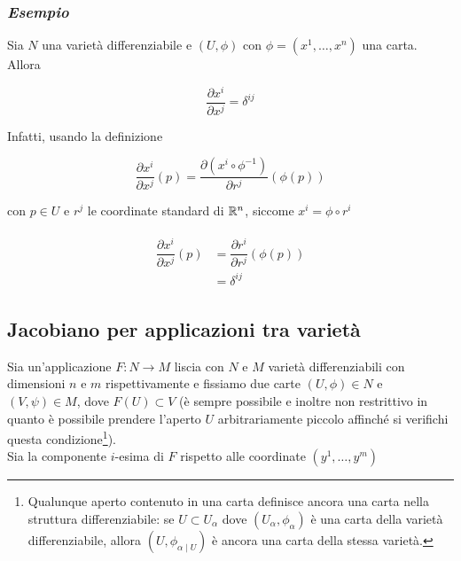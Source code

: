 \subsubsection{\textit{Esempio}}

Sia $ N $ una varietà differenziabile e $ (U,\phi) $ con $ \phi = (x^{1},\dots,x^{n}) $ una carta.\\
Allora

\begin{equation}
	\dfrac{\partial x^{i}}{\partial x^{j}} = \delta^{ij}
\end{equation}

Infatti, usando la definizione

\begin{equation}
	\dfrac{\partial x^{i}}{\partial x^{j}} (p) = \dfrac{\partial (x^{i} \circ \phi^{-1})}{\partial r^{j}} (\phi(p))
\end{equation}

con $ p \in U $ e $ r^{j} $ le coordinate standard di $ \mathbb{R}^{n} $, siccome $ x^{i} = \phi \circ r^{i} $

\begin{align}
	\begin{split}
		\dfrac{\partial x^{i}}{\partial x^{j}} (p) &= \dfrac{\partial r^{i}}{\partial r^{j}} (\phi(p))\\
		&= \delta^{ij}
	\end{split}
\end{align}

\subsection{Jacobiano per applicazioni tra varietà}

Sia un'applicazione $ F : N \to M $ liscia con $ N $ e $ M $ varietà differenziabili con dimensioni $ n $ e $ m $ rispettivamente e fissiamo due carte $ (U,\phi) \in N $ e $ (V,\psi) \in M $, dove $ F(U) \subset V $ (è sempre possibile e inoltre non restrittivo in quanto è possibile prendere l'aperto $ U $ arbitrariamente piccolo affinché si verifichi questa condizione\footnote{%
	Qualunque aperto contenuto in una carta definisce ancora una carta nella struttura differenziabile: se $ U \subset U_{\alpha} $ dove $ (U_{\alpha},\phi_{\alpha}) $ è una carta della varietà differenziabile, allora $ (U, \phi_{\alpha \mid U}) $ è ancora una carta della stessa varietà.%
}).\\
Sia la componente $ i $-esima di $ F $ rispetto alle coordinate $ (y^{1},\dots,y^{m}) $

